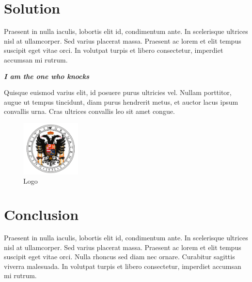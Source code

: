 \section{Solution}

Praesent in nulla iaculis, lobortis elit id, condimentum
ante. In scelerisque ultrices nisl at ullamcorper. Sed varius placerat massa.
Praesent ac lorem et elit tempus suscipit eget vitae orci. In volutpat turpis et
libero consectetur, imperdiet accumsan mi rutrum.

\begin{center}
    \textbf{\emph{I am the one who knocks}}
\end{center}

Quisque euismod varius elit, id posuere purus ultricies vel. Nullam porttitor,
augue ut tempus tincidunt, diam purus hendrerit metus, et auctor lacus ipsum
convallis urna. Cras ultrices convallis leo sit amet congue.

\begin{figure}[H]
    \centering
    \includegraphics[width=3cm]{images/university_logo.png}
    \caption{Logo}
    \label{logo}
\end{figure}

\section{Conclusion}
Praesent in nulla iaculis, lobortis elit id, condimentum
ante. In scelerisque ultrices nisl at ullamcorper. Sed varius placerat massa.
Praesent ac lorem et elit tempus suscipit eget vitae orci. Nulla rhoncus sed
diam nec ornare. Curabitur sagittis viverra malesuada. In volutpat turpis et
libero consectetur, imperdiet accumsan mi rutrum.
